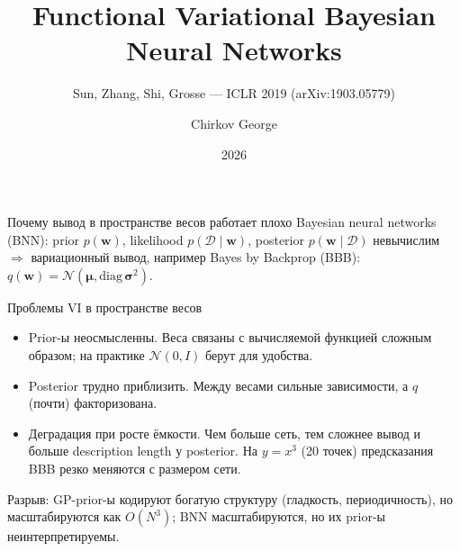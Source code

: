 \documentclass[aspectratio=169,9pt]{beamer}
\title[Functional Variational BNNs]{Functional Variational Bayesian Neural Networks}
\subtitle{Sun, Zhang, Shi, Grosse --- ICLR 2019 (arXiv:1903.05779)}
\author{Chirkov George}
\institute{Bayesian multimodeling, МФТИ}
\date{2026}
\begin{document}
\begin{frame}
  \titlepage
\end{frame}

\begin{frame}{Почему вывод в пространстве весов работает плохо}
  Bayesian neural networks (BNN): prior $p(\mathbf w)$, likelihood $p(\mathcal D\mid\mathbf w)$, posterior $p(\mathbf w\mid\mathcal D)$ невычислим $\Rightarrow$ вариационный вывод, например Bayes by Backprop (BBB): $q(\mathbf w)=\mathcal N(\boldsymbol\mu,\mathrm{diag}\,\boldsymbol\sigma^2)$.
  \vspace{0.4em}
  \begin{block}{Проблемы VI в пространстве весов}
    \begin{itemize}
      \item Prior-ы неосмысленны. Веса связаны с вычисляемой функцией сложным образом; на практике $\mathcal N(0,I)$ берут для удобства.
      \item Posterior трудно приблизить. Между весами сильные зависимости, а $q$ (почти) факторизована.
      \item Деградация при росте ёмкости. Чем больше сеть, тем сложнее вывод и больше description length у posterior. На $y=x^3$ (20 точек) предсказания BBB резко меняются с размером сети.
    \end{itemize}
  \end{block}
  Разрыв: GP-prior-ы кодируют богатую структуру (гладкость, периодичность), но масштабируются как $O(N^3)$; BNN масштабируются, но их prior-ы неинтерпретируемы.
\end{frame}
\end{document}
